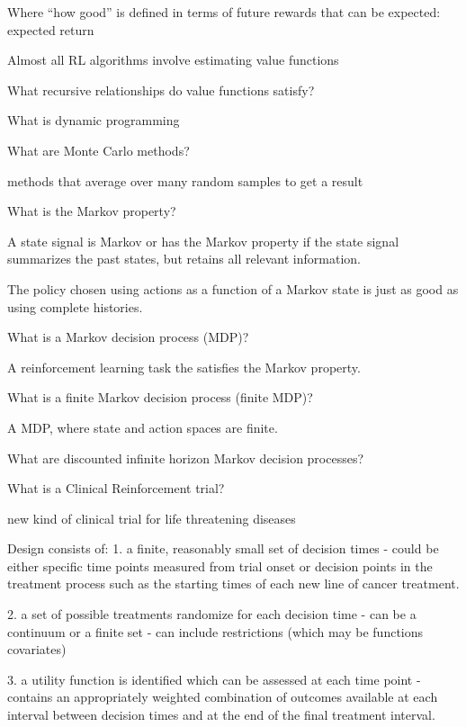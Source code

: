 \documentclass[10pt]{article}
\begin{document}
Where ``how good'' is defined in terms of future rewards that can be expected: expected return

Almost all RL algorithms involve estimating value functions

\hrulefill

What recursive relationships do value functions satisfy?


\hrulefill

What is dynamic programming

\hrulefill

What are Monte Carlo methods?

methods that average over many random samples to get a result


\hrulefill

What is the Markov property?

A state signal is Markov or has the Markov property if the state signal summarizes the past states, but retains all relevant information. 

The policy chosen using actions as a function of a Markov state is just as good as using complete histories.

\hrulefill

What is a Markov decision process (MDP)?

A reinforcement learning task the satisfies the Markov property.   

\hrulefill

What is a finite Markov decision process (finite MDP)?

A MDP, where state and action spaces are finite.

\hrulefill

What are discounted infinite horizon Markov decision processes?

\hrulefill

What is a Clinical Reinforcement trial?

new kind of clinical trial for life threatening diseases

Design consists of:
1. a finite, reasonably small set of decision times
	- could be either specific time points measured from trial onset or decision points in the treatment process such as the starting times of each new line of cancer treatment. 

2. a set of possible treatments randomize for each decision time
	- can be a continuum or a finite set
	- can include restrictions (which may be functions covariates)

3. a utility function is identified which can be assessed at each time point
	- contains an appropriately weighted combination of outcomes available at each interval between decision times and at the end of the final treatment interval.
	
\end{document}
